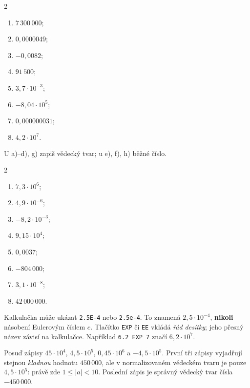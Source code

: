 \documentclass[11pt,a4paper]{article}
\begin{document}
\begin{zadaniReseniBox}[breakable=false,title={Samostatná práce 1}]
\begin{multicols}{2}
\begin{enumerate}[label=\alph*)]
\item $7\,300\,000$;
\item $0{,}0000049$;
\item $-0{,}0082$;
\item $91\,500$;
\item $3{,}7\cdot10^{-3}$;
\item $-8{,}04\cdot10^5$;
\item $0{,}000000031$;
\item $4{,}2\cdot10^7$.
\end{enumerate}
\end{multicols}
U a)--d), g) zapiš vědecký tvar; u e), f), h) běžné číslo.
\tcblower
\begin{multicols}{2}
\begin{enumerate}[label=\alph*)]
\item $7{,}3\cdot10^6$;
\item $4{,}9\cdot10^{-6}$;
\item $-8{,}2\cdot10^{-3}$;
\item $9{,}15\cdot10^4$;
\item $0{,}0037$;
\item $-804\,000$;
\item $3{,}1\cdot10^{-8}$;
\item $42\,000\,000$.
\end{enumerate}
\end{multicols}
\end{zadaniReseniBox}

Kalkulačka může ukázat \texttt{2.5E-4} nebo \texttt{2.5e-4}.
To znamená $2{,}5\cdot10^{-4}$, \textbf{nikoli} násobení Eulerovým číslem $e$.
Tlačítko \texttt{EXP} či \texttt{EE} vkládá \emph{řád desítky}; jeho přesný název
závisí na kalkulačce. Například \texttt{6.2 EXP 7} značí $6{,}2\cdot10^7$.

\begin{prikladReseniBox}[breakable=false,title={Příklad 2}]
Posuď zápisy $45\cdot10^4$, $4{,}5\cdot10^5$,
$0{,}45\cdot10^6$ a $-4{,}5\cdot10^5$.
\tcblower
První tři zápisy vyjadřují stejnou \emph{kladnou} hodnotu
$450\,000$, ale v normalizovaném vědeckém tvaru je pouze
$\boxed{4{,}5\cdot10^5}$: právě zde $1\le|a|<10$.
Poslední zápis je správný vědecký tvar čísla $-450\,000$.
\end{prikladReseniBox}
\end{document}
